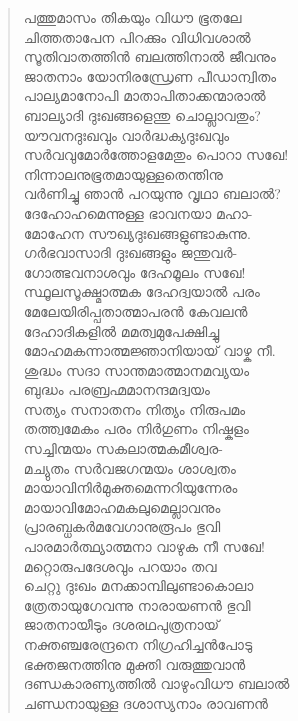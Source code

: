 \begin{verse}
പത്തുമാസം തികയും വിധൗ ഭൂതലേ\\
ചിത്തതാപേന പിറക്കും വിധിവശാല്‍\\
സൂതിവാതത്തിന്‍ ബലത്തിനാല്‍ ജീവനും\\
ജാതനാം യോനിരന്ധ്രേണ പീഡാന്വിതം\\
പാല്യമാനോപി മാതാപിതാക്കന്മാരാല്‍\\
ബാല്യാദി ദുഃഖങ്ങളെന്തു ചൊല്ലാവതും?\\
യൗവനദുഃഖവും വാര്‍ദ്ധക്യദുഃഖവും\\
സര്‍വവുമോര്‍ത്തോളമേതും പൊറാ സഖേ!\\
നിന്നാലനുഭൂതമായുള്ളതെന്തിനു\\
വര്‍ണിച്ചു ഞാന്‍ പറയുന്നു വൃഥാ ബലാല്‍?\\
ദേഹോഹമെന്നുള്ള ഭാവനയാ മഹാ-\\
മോഹേന സൗഖ്യദുഃഖങ്ങളുണ്ടാകുന്നു.\\
ഗര്‍ഭവാസാദി ദുഃഖങ്ങളും ജന്തുവര്‍-\\
ഗോത്ഭവനാശവും ദേഹമൂലം സഖേ!\\
സ്ഥൂലസൂക്ഷ്മാത്മക ദേഹദ്വയാല്‍ പരം\\
മേലേയിരിപ്പതാത്മാപരന്‍ കേവലന്‍\\
ദേഹാദികളില്‍ മമത്വമുപേക്ഷിച്ചു\\
മോഹമകന്നാത്മജ്ഞാനിയായ് വാഴ്ക നീ.\\
ശുദ്ധം സദാ സാന്തമാത്മാനമവ്യയം\\
ബുദ്ധം പരബ്രഹ്മമാനന്ദമദ്വയം\\
സത്യം സനാതനം നിത്യം നിരുപമം\\
തത്ത്വമേകം പരം നിര്‍ഗുണം നിഷ്കളം\\
സച്ചിന്മയം സകലാത്മകമീശ്വര-\\
മച്യുതം സര്‍വജഗന്മയം ശാശ്വതം\\
മായാവിനിര്‍മുക്തമെന്നറിയുന്നേരം\\
മായാവിമോഹമകലുമെല്ലാവനും\\
പ്രാരബ്ധകര്‍മവേഗാനുരൂപം ഭുവി\\
പാരമാര്‍ത്ഥ്യാത്മനാ വാഴുക നീ സഖേ!\\
മറ്റൊരുപദേശവും പറയാം തവ\\
ചെറ്റു ദുഃഖം മനക്കാമ്പിലുണ്ടാകൊലാ\\
ത്രേതായുഗേവന്നു നാരായണന്‍ ഭുവി\\
ജാതനായീടും ദശരഥപുത്രനായ്\\
നക്തഞ്ചരേന്ദ്രനെ നിഗ്രഹിച്ചന്‍പോടു\\
ഭക്തജനത്തിനു മുക്തി വരുത്തുവാന്‍\\
ദണ്ഡകാരണ്യത്തില്‍ വാഴുംവിധൗ ബലാല്‍\\
ചണ്ഡനായുള്ള ദശാസ്യനാം രാവണന്‍\\

\end{verse}
